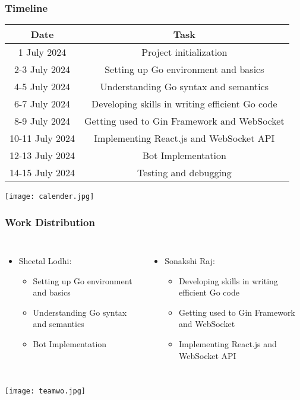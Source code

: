 \documentclass{beamer}
\begin{document}
\begin{frame}
  \frametitle{Timeline}
  \begin{table}[ht]
    \begin{tabular}{|c|c|}
      \hline
      Date & Task \\
      \hline
      1 July 2024 & Project initialization \\
      2-3 July 2024 & Setting up Go environment and basics \\
      4-5 July 2024 & Understanding Go syntax and semantics \\
      6-7 July 2024 & Developing skills in writing efficient Go code \\
      8-9 July 2024 & Getting used to Gin Framework and WebSocket \\
      10-11 July 2024 & Implementing React.js and WebSocket API \\
      12-13 July 2024 & Bot Implementation \\
      14-15 July 2024 & Testing and debugging \\
      \hline
    \end{tabular}
  \end{table}
  \texttt{[image: calender.jpg]}
\end{frame}
\begin{frame}
  \frametitle{Work Distribution}
  \begin{columns}
      \begin{itemize}
        \item Sheetal Lodhi:
          \begin{itemize}
            \item Setting up Go environment and basics
            \item Understanding Go syntax and semantics
            \item Bot Implementation
          \end{itemize}
      \end{itemize}
      \begin{itemize}
        \item Sonakshi Raj:
          \begin{itemize}
            \item Developing skills in writing efficient Go code
            \item Getting used to Gin Framework and WebSocket
            \item Implementing React.js and WebSocket API
          \end{itemize}
        \end{itemize}
      \end{columns}
  \texttt{[image: teamwo.jpg]}
\end{frame}
\end{document}
